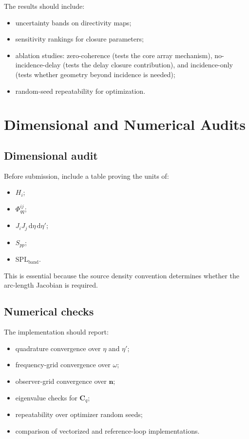 \documentclass[11pt]{article}
\newcommand{\dd}{\,\mathrm{d}}
\newcommand{\vect}[1]{\bm{#1}}
\newcommand{\mat}[1]{\bm{#1}}
\begin{document}
The results should include:

\begin{itemize}
    \item uncertainty bands on directivity maps;
    \item sensitivity rankings for closure parameters;
    \item ablation studies: zero-coherence (tests the core array mechanism), no-incidence-delay (tests the delay closure contribution), and incidence-only (tests whether geometry beyond incidence is needed);
    \item random-seed repeatability for optimization.
\end{itemize}

\section{Dimensional and Numerical Audits}

\subsection{Dimensional audit}

Before submission, include a table proving the units of:

\begin{itemize}
    \item $H_i$;
    \item $\Phi_{qq}^{ij}$;
    \item $J_iJ_j\dd\eta\dd\eta'$;
    \item $S_{pp}$;
    \item $\mathrm{SPL}_{\mathrm{band}}$.
\end{itemize}

This is essential because the source density convention determines whether the arc-length Jacobian is required.

\subsection{Numerical checks}

The implementation should report:

\begin{itemize}
    \item quadrature convergence over $\eta$ and $\eta'$;
    \item frequency-grid convergence over $\omega$;
    \item observer-grid convergence over $\vect{n}$;
    \item eigenvalue checks for $\mat{C}_q$;
    \item repeatability over optimizer random seeds;
    \item comparison of vectorized and reference-loop implementations.
\end{itemize}
\end{document}

